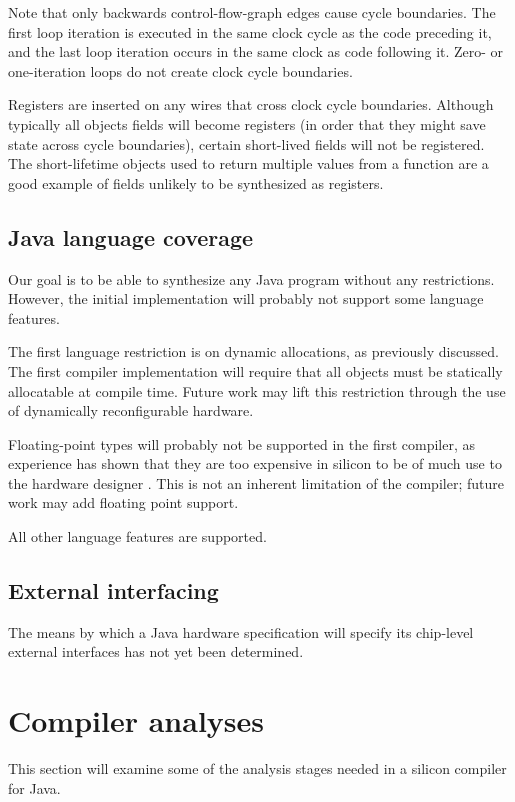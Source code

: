 \documentclass[11pt,notitlepage,twocolumn]{article}
\begin{document}
Note that only backwards control-flow-graph edges cause cycle
boundaries.  The first loop iteration is executed in the same clock
cycle as the code preceding it, and the last loop iteration occurs in
the same clock as code following it.  Zero- or one-iteration loops do
not create clock cycle boundaries.

Registers are inserted on any wires that cross clock cycle
boundaries.  Although typically all objects fields will become
registers (in order that they might save state across cycle
boundaries), certain short-lived fields will not be registered.  The
short-lifetime objects used to return multiple values from a function
are a good example of fields unlikely to be synthesized as registers.

\subsection{Java language coverage}
Our goal is to be able to synthesize any Java program without any
restrictions.  However, the initial implementation will probably not
support some language features.

The first language restriction is on dynamic allocations, as
previously discussed.  The first compiler implementation will require
that all objects must be statically allocatable at compile time.
Future work may lift this restriction through the use of dynamically
reconfigurable hardware.

Floating-point types will probably not be supported in the first
compiler, as experience has shown that they are too expensive in silicon
to be of much use to the hardware designer \cite{shirazi95:float}.  
This is not an inherent limitation of the compiler; future work may
add floating point support.

All other language features are supported.

\subsection{External interfacing}

The means by which a Java hardware specification will specify its
chip-level external interfaces has not yet been determined.

\section{Compiler analyses}
This section will examine some of the analysis stages needed in a
silicon compiler for Java.
\end{document}

